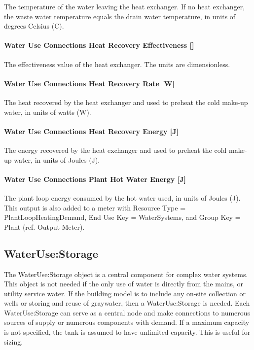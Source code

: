 The temperature of the water leaving the heat exchanger. If no heat exchanger, the waste water temperature equals the drain water temperature, in units of degrees Celsius (C).

\paragraph{Water Use Connections Heat Recovery Effectiveness {[]}}\label{water-use-connections-heat-recovery-effectiveness}

The effectiveness value of the heat exchanger. The units are dimensionless.

\paragraph{Water Use Connections Heat Recovery Rate {[}W{]}}\label{water-use-connections-heat-recovery-rate-w}

The heat recovered by the heat exchanger and used to preheat the cold make-up water, in units of watts (W).

\paragraph{Water Use Connections Heat Recovery Energy {[}J{]}}\label{water-use-connections-heat-recovery-energy-j}

The energy recovered by the heat exchanger and used to preheat the cold make-up water, in units of Joules (J).

\paragraph{Water Use Connections Plant Hot Water Energy {[}J{]}}\label{water-use-connections-plant-hot-water-energy-j}

The plant loop energy consumed by the hot water used, in units of Joules (J). This output is also added to a meter with Resource Type = PlantLoopHeatingDemand, End Use Key = WaterSystems, and Group Key = Plant (ref. Output Meter).

\subsection{WaterUse:Storage}\label{waterusestorage}

The WaterUse:Storage object is a central component for complex water systems. This object is not needed if the only use of water is directly from the mains, or utility service water. If the building model is to include any on-site collection or wells or storing and reuse of graywater, then a WaterUse:Storage is needed. Each WaterUse:Storage can serve as a central node and make connections to numerous sources of supply or numerous components with demand. If a maximum capacity is not specified, the tank is assumed to have unlimited capacity. This is useful for sizing.

